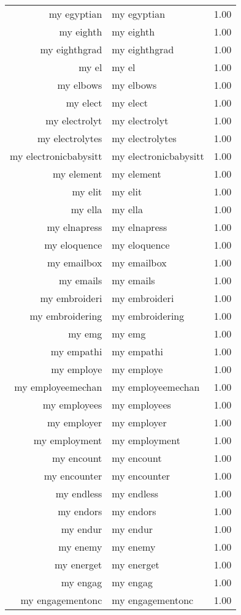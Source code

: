 \begin{table}[ht]
\begin{tabular}{rlr}
  my egyptian & my egyptian & 1.00 \\ 
  my eighth & my eighth & 1.00 \\ 
  my eighthgrad & my eighthgrad & 1.00 \\ 
  my el & my el & 1.00 \\ 
  my elbows & my elbows & 1.00 \\ 
  my elect & my elect & 1.00 \\ 
  my electrolyt & my electrolyt & 1.00 \\ 
  my electrolytes & my electrolytes & 1.00 \\ 
  my electronicbabysitt & my electronicbabysitt & 1.00 \\ 
  my element & my element & 1.00 \\ 
  my elit & my elit & 1.00 \\ 
  my ella & my ella & 1.00 \\ 
  my elnapress & my elnapress & 1.00 \\ 
  my eloquence & my eloquence & 1.00 \\ 
  my emailbox & my emailbox & 1.00 \\ 
  my emails & my emails & 1.00 \\ 
  my embroideri & my embroideri & 1.00 \\ 
  my embroidering & my embroidering & 1.00 \\ 
  my emg & my emg & 1.00 \\ 
  my empathi & my empathi & 1.00 \\ 
  my employe & my employe & 1.00 \\ 
  my employeemechan & my employeemechan & 1.00 \\ 
  my employees & my employees & 1.00 \\ 
  my employer & my employer & 1.00 \\ 
  my employment & my employment & 1.00 \\ 
  my encount & my encount & 1.00 \\ 
  my encounter & my encounter & 1.00 \\ 
  my endless & my endless & 1.00 \\ 
  my endors & my endors & 1.00 \\ 
  my endur & my endur & 1.00 \\ 
  my enemy & my enemy & 1.00 \\ 
  my energet & my energet & 1.00 \\ 
  my engag & my engag & 1.00 \\ 
  my engagementonc & my engagementonc & 1.00 \\ 

\end{tabular}
\end{table}
